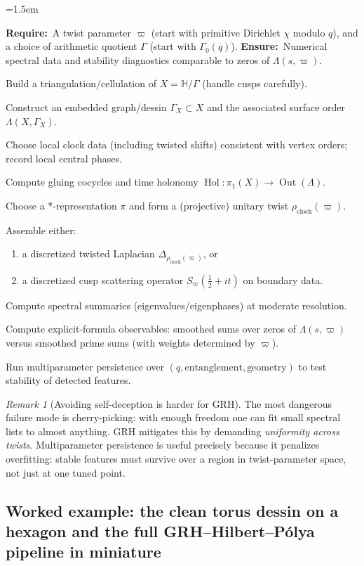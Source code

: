\documentclass[11pt,oneside]{amsbook}
\numberwithin{equation}{section}
\newenvironment{algorithmic}[1][]{\par\begin{list}{}{\leftmargin=1.5em}\item[]}{\end{list}}
\newcommand{\Require}{\textbf{Require:}~}
\newcommand{\Ensure}{\textbf{Ensure:}~}
\newcommand{\State}{\par\noindent}
\theoremstyle{plain}
\theoremstyle{definition}
\theoremstyle{remark}
\newtheorem{remark}[theorem]{Remark}
\newcommand{\HH}{\mathbb{H}}
\DeclareMathOperator{\Hol}{\mathrm{Hol}}
\DeclareMathOperator{\Out}{\mathrm{Out}}
\begin{document}
\begin{algorithm}[h]
\caption{Minimal GRH-oriented Hilbert--Pólya test pipeline}
\begin{algorithmic}[1]
\Require A twist parameter $\varpi$ (start with primitive Dirichlet $\chi$ modulo $q$), and a choice of arithmetic quotient $\Gamma$ (start with $\Gamma_0(q)$).
\Ensure Numerical spectral data and stability diagnostics comparable to zeros of $\Lambda(s,\varpi)$.
\State Build a triangulation/cellulation of $X=\HH/\Gamma$ (handle cusps carefully).
\State Construct an embedded graph/dessin $\Gamma_X\subset X$ and the associated surface order $\Lambda(X,\Gamma_X)$.
\State Choose local clock data (including twisted shifts) consistent with vertex orders; record local central phases.
\State Compute gluing cocycles and time holonomy $\Hol:\pi_1(X)\to \Out(\Lambda)$.
\State Choose a *-representation $\pi$ and form a (projective) unitary twist $\rho_{\mathrm{clock}}(\varpi)$.
\State Assemble either:
\begin{enumerate}[label=(\alph*)]
\item a discretized twisted Laplacian $\Delta_{\rho_{\mathrm{clock}}(\varpi)}$, or
\item a discretized cusp scattering operator $S_{\varpi}(\tfrac12+it)$ on boundary data.
\end{enumerate}
\State Compute spectral summaries (eigenvalues/eigenphases) at moderate resolution.
\State Compute explicit-formula observables: smoothed sums over zeros of $\Lambda(s,\varpi)$ versus smoothed prime sums (with weights determined by $\varpi$).
\State Run multiparameter persistence over $(q,\text{entanglement},\text{geometry})$ to test stability of detected features.
\end{algorithmic}
\end{algorithm}

\begin{remark}[Avoiding self-deception is harder for GRH]
The most dangerous failure mode is cherry-picking: with enough freedom one can fit small spectral lists to almost anything.
GRH mitigates this by demanding \emph{uniformity across twists}.
Multiparameter persistence is useful precisely because it penalizes overfitting: stable features must survive over a region in twist-parameter space, not just at one tuned point.
\end{remark}


\subsection{Worked example: the clean torus dessin on a hexagon and the full GRH--Hilbert--Pólya pipeline in miniature}
\label{sec:hp_worked_example_torus}
\end{document}
